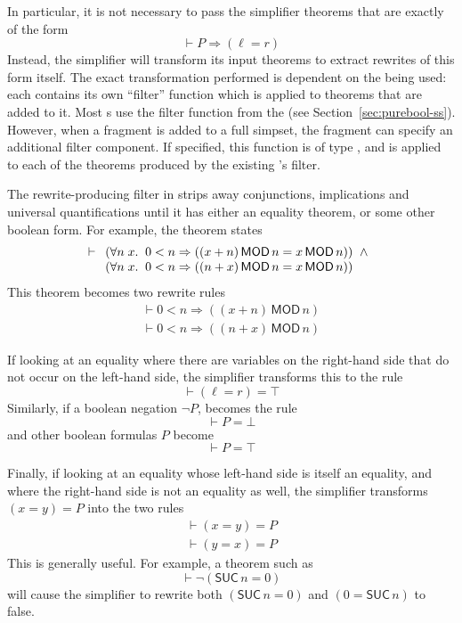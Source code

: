 {In particular, it is not necessary to pass the simplifier theorems
that are exactly of the form
\[
\vdash P \Rightarrow (\ell = r)
\]
Instead, the simplifier will transform its input theorems to extract
rewrites of this form itself.  The exact transformation performed is
dependent on the \simpset{} being used: each \simpset{} contains its
own ``filter'' function which is applied to theorems that are added to
it.  Most \simpset{}s use the filter function from the 
\simpset{} (see Section~\ref{sec:purebool-ss}).  However, when a
\simpset{} fragment is added to a full simpset, the fragment can
specify an additional filter component.  If specified, this function
is of type , and is applied to each of the
theorems produced by the existing \simpset's filter.

The rewrite-producing filter in  strips away
conjunctions, implications and universal quantifications until it has
either an equality theorem, or some other boolean form.  For example,
the theorem  states
\[
\vdash
\begin{array}[t]{l}
(\forall n\;x.\;\;0 < n \Rightarrow ((x + n)\,\textsf{MOD}\,n =
 x\,\textsf{MOD}\,n)) \;\;\land\\
(\forall n\;x.\;\;0 < n \Rightarrow ((n + x)\,\textsf{MOD}\,n =
 x\,\textsf{MOD}\,n))
\end{array}
\]
This theorem becomes two rewrite rules \[
\begin{array}{l}
\vdash 0 < n \Rightarrow ((x + n)\,\textsf{MOD}\,n)\\
\vdash 0 < n \Rightarrow ((n + x)\,\textsf{MOD}\,n)
\end{array}
\]

If looking at an equality where there are variables on the
right-hand side that do not occur on the left-hand side, the
simplifier transforms this to the rule \[
\vdash (\ell = r) = \top
\]
Similarly, if a boolean negation $\neg P$, becomes the rule \[
\vdash P = \bot
\]
and other boolean formulas $P$ become \[
\vdash P = \top
\]

Finally, if looking at an equality whose left-hand side is itself an
equality, and where the right-hand side is not an equality as well,
the simplifier transforms $(x = y) = P$ into the two rules
\[
\begin{array}{l}
\vdash (x = y) = P\\
\vdash (y = x) = P
\end{array}
\]
This is generally useful.  For example, a theorem such as
\[
\vdash \neg(\textsf{SUC}\,n = 0)
\]
will cause the simplifier to rewrite both $(\textsf{SUC}\,n = 0)$ and
$(0 = \textsf{SUC}\,n)$ to false.

}

